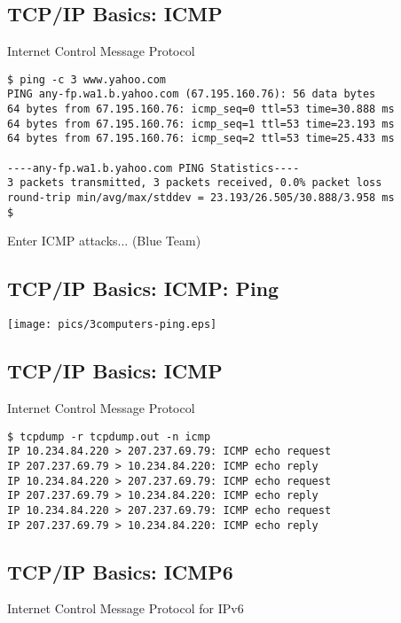 \documentclass[xga]{xdvislides}
\begin{document}
\subsection{TCP/IP Basics: ICMP}
\begin{center}
Internet Control Message Protocol
\end{center}
\vspace{.2in}

\begin{verbatim}
$ ping -c 3 www.yahoo.com
PING any-fp.wa1.b.yahoo.com (67.195.160.76): 56 data bytes
64 bytes from 67.195.160.76: icmp_seq=0 ttl=53 time=30.888 ms
64 bytes from 67.195.160.76: icmp_seq=1 ttl=53 time=23.193 ms
64 bytes from 67.195.160.76: icmp_seq=2 ttl=53 time=25.433 ms

----any-fp.wa1.b.yahoo.com PING Statistics----
3 packets transmitted, 3 packets received, 0.0% packet loss
round-trip min/avg/max/stddev = 23.193/26.505/30.888/3.958 ms
$
\end{verbatim}
\vspace{.25in}
Enter ICMP attacks... (Blue Team)

\subsection{TCP/IP Basics: ICMP: Ping}
\vspace*{\fill}
\begin{center}
	\texttt{[image: pics/3computers-ping.eps]}
\end{center}
\vspace*{\fill}


\subsection{TCP/IP Basics: ICMP}
\begin{center}
Internet Control Message Protocol
\end{center}
\vspace{.2in}

\begin{verbatim}
$ tcpdump -r tcpdump.out -n icmp
IP 10.234.84.220 > 207.237.69.79: ICMP echo request
IP 207.237.69.79 > 10.234.84.220: ICMP echo reply
IP 10.234.84.220 > 207.237.69.79: ICMP echo request
IP 207.237.69.79 > 10.234.84.220: ICMP echo reply
IP 10.234.84.220 > 207.237.69.79: ICMP echo request
IP 207.237.69.79 > 10.234.84.220: ICMP echo reply
\end{verbatim}


\subsection{TCP/IP Basics: ICMP6}
\begin{center}
Internet Control Message Protocol for IPv6
\end{center}
\vspace{.2in}
\end{document}
